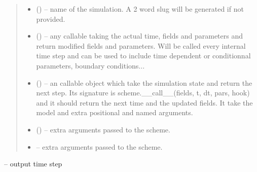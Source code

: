 \documentclass[letterpaper,10pt,english]{sphinxmanual}
\begin{document}
\begin{fulllineitems}
\begin{quote}
\begin{description}
\begin{itemize}
\item {} 
 (\sphinxstyleliteralemphasis{, }) -- name of the simulation. A 2 word slug will be generated if not provided.

\item {} 
 (\sphinxstyleliteralemphasis{, }) -- any callable taking the actual time, fields and parameters and return modified fields and parameters. Will be called every internal time step and can be used to include time dependent or conditionnal parameters, boundary conditions...

\item {} 
 (\sphinxstyleliteralemphasis{, }\sphinxstyleliteralemphasis{, }) -- an callable object which take the simulation state and return the next step. Its signature is scheme.\_\_call\_\_(fields, t, dt, pars, hook) and it should return the next time and the updated fields. It take the model and extra positional and named arguments.

\item {} 
 (\sphinxstyleliteralemphasis{,}\sphinxstyleliteralemphasis{}) -- 
extra arguments passed to the scheme.


\item {} 
 -- 
extra arguments passed to the scheme.


\end{itemize}

\end{description}\end{quote}

\begin{fulllineitems}
\label{\detokenize{triflow.core:triflow.core.simulation.Simulation.dt}}
 -- output time step

\end{fulllineitems}


\end{fulllineitems}
\end{document}
